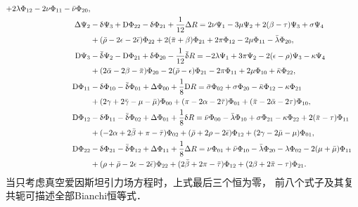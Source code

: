 \begin{subequations}
\begin{align}
        +2\lambda \Phi_{12}-2\nu\Phi_{11}-\bar{\nu}\Phi_{20}, \\
        \Delta \Psi_{2}&-\updelta \Psi_{3}  +{\rm D} \Phi_{22} -\updelta \Phi_{21}
        +\frac{1}{12}{\Delta}R =2\nu \Psi_{1}-3\mu \Psi_{2}+2(\beta -\tau )
        \Psi_{3}+\sigma \Psi_{4} \notag\\
        &+(\bar{\rho}-2\epsilon-2\bar{\epsilon})\Phi_{22}+2(\bar{\pi}+\beta)\Phi_{21}
        +2\pi\Phi_{12} -2\mu \Phi_{11} -\bar{\lambda}\Phi_{20},  \\
        {\rm D}\Psi_{3}&-\bar{\updelta }\Psi_{2} - {\rm D} \Phi_{21} + \updelta \Phi_{20}
        -\frac{1}{12}\bar{\updelta}R =-2\lambda \Psi_{1} + 3\pi \Psi_{2}
        -2(\epsilon -\rho )\Psi_{3} -\kappa \Psi_{4} \notag\\
        &+(2\bar{\alpha}-2\beta-\bar{\pi})\Phi_{20} - 2(\bar{\rho}-\epsilon)\Phi_{21}
        -2\pi\Phi_{11}+2\mu\Phi_{10} + \bar{\kappa}\Phi_{22}, \\
        {\rm D} \Phi_{11}&-\updelta \Phi_{10} - \bar{\updelta} \Phi_{01} + {\Delta} \Phi_{00}
        +\frac{1}{8}{\rm D}R = \bar{\sigma}\Phi_{02} +\sigma\Phi_{20}
        -\bar{\kappa}\Phi_{12} - \kappa \Phi_{21} \notag \\
        & +(2\gamma+2\bar{\gamma} -\mu-\bar{\mu})\Phi_{00} +(\pi-2\alpha -2\bar{\tau})\Phi_{01}
        + (\bar{\pi}-2\bar{\alpha}-2\tau)\Phi_{10},  \\
        {\rm D} \Phi_{12}&-\updelta \Phi_{11} - \bar{\updelta} \Phi_{02} + {\Delta} \Phi_{01}
        +\frac{1}{8}{\updelta}R = \bar{\nu}\Phi_{00} - \bar{\lambda}\Phi_{10}
        +{\sigma}\Phi_{21} - \kappa \Phi_{22} +2(\bar{\pi}-\tau)\Phi_{11} \notag \\
        & +(-2\alpha+2\bar{\beta} +\pi-\bar{\tau})\Phi_{02}
        +(\bar{\rho}+2\rho -2\bar{\epsilon})\Phi_{12}
        +(2\gamma-2\bar{\mu}-\mu)\Phi_{01},  \\
        {\rm D} \Phi_{22}&-\updelta \Phi_{21} - \bar{\updelta} \Phi_{12} + {\Delta} \Phi_{11}
        +\frac{1}{8}{\Delta}R = {\nu}\Phi_{01} +\bar{\nu}\Phi_{10} -\bar{\lambda}\Phi_{20}
        -{\lambda}\Phi_{02} -2(\mu +\bar{\mu})\Phi_{11} \notag \\
        & +(\rho+\bar{\rho} - 2\epsilon-2\bar{\epsilon})\Phi_{22}
        +(2\bar{\beta}+2\pi -\bar{\tau})\Phi_{12}
        +(2{\beta}+2\bar{\pi} -{\tau})\Phi_{21} .
    \end{align}
\end{subequations} \setlength{\mathindent}{2em} 
当只考虑真空爱因斯坦引力场方程时，上式最后三个恒为零，
前八个式子及其复共轭可描述全部Bianchi恒等式．










